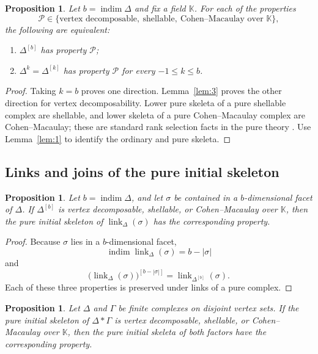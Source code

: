 \documentclass[11pt]{amsart}
\newcommand{\K}{\mathbb K}
\DeclareMathOperator{\indim}{indim}
\DeclareMathOperator{\link}{link}
\newtheorem{proposition}[theorem]{Proposition}
\theoremstyle{definition}
\begin{document}
	\begin{proposition}\label{prop:3}
		Let $b=\indim\Delta$ and fix a field $\K$.  For each of the properties
		\[
		\mathcal P\in\{\text{vertex decomposable},\ \text{shellable},\
		\text{Cohen--Macaulay over }\K\},
		\]
		the following are equivalent:
		\begin{enumerate}[label=\textup{(\roman*)}]
			\item $\Delta^{[b]}$ has property $\mathcal P$;
			\item $\Delta^k=\Delta^{[k]}$ has property $\mathcal P$ for every $-1\leq k\leq b$.
		\end{enumerate}
	\end{proposition}
	
	\begin{proof}
		Taking $k=b$ proves one direction.  Lemma~\ref{lem:3} proves the other direction for vertex decomposability.  Lower pure skeleta of a pure shellable complex are shellable, and lower skeleta of a pure Cohen--Macaulay complex are Cohen--Macaulay; these are standard rank selection facts in the pure theory \cite{BjornerWachs1996,Namiq2026Skeletons,ProvanBillera1980}. Use Lemma~\ref{lem:1} to identify the ordinary and pure skeleta.
	\end{proof}
	
	\subsection{Links and joins of the pure initial skeleton}
	
	\begin{proposition}\label{prop:4}
		Let $b=\indim\Delta$, and let $\sigma$ be contained in a $b$-dimensional facet of $\Delta$.  If $\Delta^{[b]}$ is vertex decomposable, shellable, or Cohen--Macaulay over $\K$, then the pure initial skeleton of $\link_\Delta(\sigma)$ has the corresponding property.
	\end{proposition}
	
	\begin{proof}
		Because $\sigma$ lies in a $b$-dimensional facet,
		\[
		\indim\link_\Delta(\sigma)=b-|\sigma|
		\]
		and
		\[
		\bigl(\link_\Delta(\sigma)\bigr)^{[b-|\sigma|]}
		=\link_{\Delta^{[b]}}(\sigma).
		\]
		Each of these three properties is preserved under links of a pure complex.
	\end{proof}
	
	\begin{proposition}\label{prop:5}
		Let $\Delta$ and $\Gamma$ be finite complexes on disjoint vertex sets.  If the pure initial skeleton of $\Delta*\Gamma$ is vertex decomposable, shellable, or Cohen--Macaulay over $\K$, then the pure initial skeleta of both factors have the corresponding property.
	\end{proposition}
	
\end{document}
